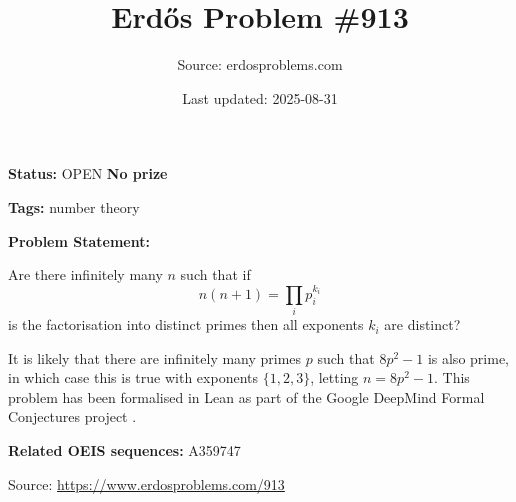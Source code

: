 \documentclass{article}
\title{Erd\H{o}s Problem \#913}
\date{Last updated: 2025-08-31}
\author{Source: erdosproblems.com}
\begin{document}
\maketitle

\noindent\textbf{Status:} OPEN \quad \textbf{No prize}

\noindent\textbf{Tags:} number theory

\medskip

\noindent\textbf{Problem Statement:}

Are there infinitely many $n$ such that if\[n(n+1) = \prod_i p_i^{k_i}\]is the factorisation into distinct primes then all exponents $k_i$ are distinct?




It is likely that there are infinitely many primes $p$ such that $8p^2-1$ is also prime, in which case this is true with exponents $\{1,2,3\}$, letting $n=8p^2-1$. This problem has been formalised in Lean as part of the Google DeepMind Formal Conjectures project .

\noindent\textbf{Related OEIS sequences:} A359747


\bigskip
\noindent\small{Source: \url{https://www.erdosproblems.com/913}}
\end{document}
